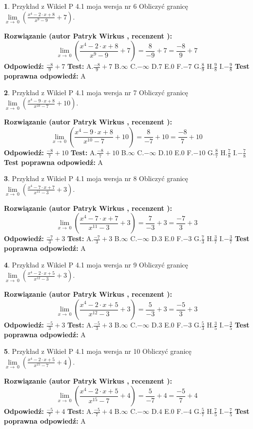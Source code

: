 \documentclass[12pt, a4paper]{article}
\theoremstyle{definition} %
\newtheorem{zad}{}
\newcommand{\zadStart}[1]{\begin{zad}#1\newline}
\newcommand{\zadStop}{\end{zad}}
\newcommand{\rozwStart}[2]{\noindent \textbf{Rozwiązanie (autor #1 , recenzent #2): }\newline}
\newcommand{\rozwStop}{\newline}
\newcommand{\odpStart}{\noindent \textbf{Odpowiedź:}\newline}
\newcommand{\odpStop}{\newline}
\newcommand{\testStart}{\noindent \textbf{Test:}\newline}
\newcommand{\testStop}{\newline}
\newcommand{\kluczStart}{\noindent \textbf{Test poprawna odpowiedź:}\newline}
\newcommand{\kluczStop}{\newline}
\begin{document}
\zadStart{Przykład z Wikieł P 4.1 moja wersja nr 6}
Obliczyć granicę $\lim\limits_{x\to\ 0}(\frac{x^{4}-2 \cdot x +8}{x^{9}-9}+7)$.
\zadStop
\rozwStart{Patryk Wirkus}{}
$$\lim\limits_{x\to\ 0}(\frac{x^{4}-2 \cdot x +8}{x^{9}-9}+7)=\frac{8}{-9}+7=\frac{-8}{9}+7$$
\rozwStop
\odpStart
$\frac{-8}{9}+7$
\odpStop
\testStart
A.$\frac{-8}{9}+7$
B.$\infty$
C.$-\infty$
D.$7$
E.$0$
F.$-7$
G.$\frac{8}{9}$
H.$\frac{9}{8}$
I.$-\frac{9}{8}$
\testStop
\kluczStart
A
\kluczStop



\zadStart{Przykład z Wikieł P 4.1 moja wersja nr 7}
Obliczyć granicę $\lim\limits_{x\to\ 0}(\frac{x^{4}-9 \cdot x +8}{x^{10}-7}+10)$.
\zadStop
\rozwStart{Patryk Wirkus}{}
$$\lim\limits_{x\to\ 0}(\frac{x^{4}-9 \cdot x +8}{x^{10}-7}+10)=\frac{8}{-7}+10=\frac{-8}{7}+10$$
\rozwStop
\odpStart
$\frac{-8}{7}+10$
\odpStop
\testStart
A.$\frac{-8}{7}+10$
B.$\infty$
C.$-\infty$
D.$10$
E.$0$
F.$-10$
G.$\frac{8}{7}$
H.$\frac{7}{8}$
I.$-\frac{7}{8}$
\testStop
\kluczStart
A
\kluczStop



\zadStart{Przykład z Wikieł P 4.1 moja wersja nr 8}
Obliczyć granicę $\lim\limits_{x\to\ 0}(\frac{x^{4}-7 \cdot x +7}{x^{11}-3}+3)$.
\zadStop
\rozwStart{Patryk Wirkus}{}
$$\lim\limits_{x\to\ 0}(\frac{x^{4}-7 \cdot x +7}{x^{11}-3}+3)=\frac{7}{-3}+3=\frac{-7}{3}+3$$
\rozwStop
\odpStart
$\frac{-7}{3}+3$
\odpStop
\testStart
A.$\frac{-7}{3}+3$
B.$\infty$
C.$-\infty$
D.$3$
E.$0$
F.$-3$
G.$\frac{7}{3}$
H.$\frac{3}{7}$
I.$-\frac{3}{7}$
\testStop
\kluczStart
A
\kluczStop



\zadStart{Przykład z Wikieł P 4.1 moja wersja nr 9}
Obliczyć granicę $\lim\limits_{x\to\ 0}(\frac{x^{4}-2 \cdot x +5}{x^{12}-3}+3)$.
\zadStop
\rozwStart{Patryk Wirkus}{}
$$\lim\limits_{x\to\ 0}(\frac{x^{4}-2 \cdot x +5}{x^{12}-3}+3)=\frac{5}{-3}+3=\frac{-5}{3}+3$$
\rozwStop
\odpStart
$\frac{-5}{3}+3$
\odpStop
\testStart
A.$\frac{-5}{3}+3$
B.$\infty$
C.$-\infty$
D.$3$
E.$0$
F.$-3$
G.$\frac{5}{3}$
H.$\frac{3}{5}$
I.$-\frac{3}{5}$
\testStop
\kluczStart
A
\kluczStop



\zadStart{Przykład z Wikieł P 4.1 moja wersja nr 10}
Obliczyć granicę $\lim\limits_{x\to\ 0}(\frac{x^{4}-2 \cdot x +5}{x^{15}-7}+4)$.
\zadStop
\rozwStart{Patryk Wirkus}{}
$$\lim\limits_{x\to\ 0}(\frac{x^{4}-2 \cdot x +5}{x^{15}-7}+4)=\frac{5}{-7}+4=\frac{-5}{7}+4$$
\rozwStop
\odpStart
$\frac{-5}{7}+4$
\odpStop
\testStart
A.$\frac{-5}{7}+4$
B.$\infty$
C.$-\infty$
D.$4$
E.$0$
F.$-4$
G.$\frac{5}{7}$
H.$\frac{7}{5}$
I.$-\frac{7}{5}$
\testStop
\kluczStart
A
\kluczStop
\end{document}

